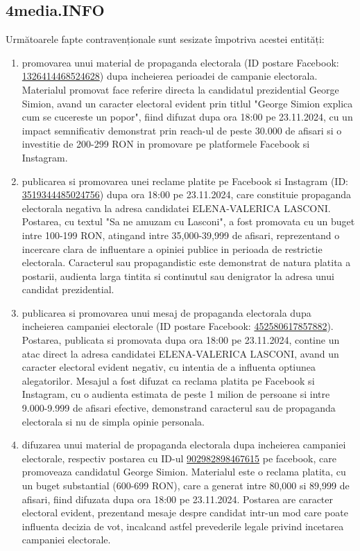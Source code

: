 \documentclass[a4paper,12pt]{article}
\begin{document}
\vspace{0.5cm}

\subsection{4media.INFO}
Următoarele fapte contravenționale sunt sesizate împotriva acestei entități:

\begin{enumerate}[leftmargin=*, label=\arabic*.)]
    \item promovarea unui material de propaganda electorala (ID postare Facebook: \href{https://www.facebook.com/ads/library/?id=1326414468524628}{1326414468524628}) dupa incheierea perioadei de campanie electorala. Materialul promovat face referire directa la candidatul prezidential George Simion, avand un caracter electoral evident prin titlul "George Simion explica cum se cucereste un popor", fiind difuzat dupa ora 18:00 pe 23.11.2024, cu un impact semnificativ demonstrat prin reach-ul de peste 30.000 de afisari si o investitie de 200-299 RON in promovare pe platformele Facebook si Instagram.
    \item publicarea si promovarea unei reclame platite pe Facebook si Instagram (ID: \href{https://www.facebook.com/ads/library/?id=3519344485024756}{3519344485024756}) dupa ora 18:00 pe 23.11.2024, care constituie propaganda electorala negativa la adresa candidatei ELENA-VALERICA LASCONI. Postarea, cu textul "Sa ne amuzam cu Lasconi", a fost promovata cu un buget intre 100-199 RON, atingand intre 35,000-39,999 de afisari, reprezentand o incercare clara de influentare a opiniei publice in perioada de restrictie electorala. Caracterul sau propagandistic este demonstrat de natura platita a postarii, audienta larga tintita si continutul sau denigrator la adresa unui candidat prezidential.
    \item publicarea si promovarea unui mesaj de propaganda electorala dupa incheierea campaniei electorale (ID postare Facebook: \href{https://www.facebook.com/ads/library/?id=452580617857882}{452580617857882}). Postarea, publicata si promovata dupa ora 18:00 pe 23.11.2024, contine un atac direct la adresa candidatei ELENA-VALERICA LASCONI, avand un caracter electoral evident negativ, cu intentia de a influenta optiunea alegatorilor. Mesajul a fost difuzat ca reclama platita pe Facebook si Instagram, cu o audienta estimata de peste 1 milion de persoane si intre 9.000-9.999 de afisari efective, demonstrand caracterul sau de propaganda electorala si nu de simpla opinie personala.
    \item difuzarea unui material de propaganda electorala dupa incheierea campaniei electorale, respectiv postarea cu ID-ul \href{https://www.facebook.com/ads/library/?id=902982898467615}{902982898467615} pe facebook, care promoveaza candidatul George Simion. Materialul este o reclama platita, cu un buget substantial (600-699 RON), care a generat intre 80,000 si 89,999 de afisari, fiind difuzata dupa ora 18:00 pe 23.11.2024. Postarea are caracter electoral evident, prezentand mesaje despre candidat intr-un mod care poate influenta decizia de vot, incalcand astfel prevederile legale privind incetarea campaniei electorale.

\end{enumerate}
\end{document}
